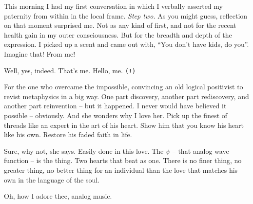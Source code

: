 

This morning I had my first conversation in which I verbally asserted
my paternity from within in the local frame.  {\it Step two.}  As you
might guess, reflection on that moment surprised me.  Not as any kind
of first, and not for the recent health gain in my outer
consciousness.  But for the breadth and depth of the expression.  I
picked up a scent and came out with, ``You don't have kids, do you''.
Imagine that!  From me!

Well, yes, indeed.  That's me.  Hello, me. {\tt (!)}

For the one who overcame the impossible, convincing an old logical
positivist to revist metaphysics in a big way.  One part discovery,
another part rediscovery, and another part reinvention -- but it
happened.  I never would have believed it possible -- obviously.  And
she wonders why I love her.  Pick up the finest of threads like an
expert in the art of his heart.  Show him that you know his heart like
his own.  Restore his faded faith in life.

Sure, why not, she says.  Easily done in this love.  The $\psi$ -- that
analog wave function -- is the thing.  Two hearts that beat as one.
There is no finer thing, no greater thing, no better thing for an
individual than the love that matches his own in the language of the
soul.

Oh, how I adore thee, analog music.

\bye

